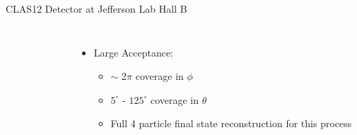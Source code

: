 \documentclass[aspectratio=169]{beamer}
\newcommand*{\myfont}{\fontfamily{lmtt}\selectfont}
\begin{document}
\begin{frame}{CLAS12 Detector at Jefferson Lab Hall B}
\begin{columns}[t, onlytextwidth]
\begin{figure}[t!]
                    
                \end{figure}
                \vspace{-0.45cm}
                \begin{itemize}
                    \setlength\itemsep{1em}

                    \item Large Acceptance:\\
                     \begin{itemize}
                            \item $\sim$ 2$\pi$ coverage in $\phi$\\
                        \item  $5^\circ$ - $125^\circ$ coverage in $\theta$
                        \item Full 4 particle final state reconstruction for this process
                    \end{itemize}
                    
                    
                \end{itemize}
                \vspace{0.3cm}
                {\myfont{\tiny V. Burkert et al., NIMA, 959, 163419 (2020) }}
        \end{columns}
\end{frame}    
\end{document}
